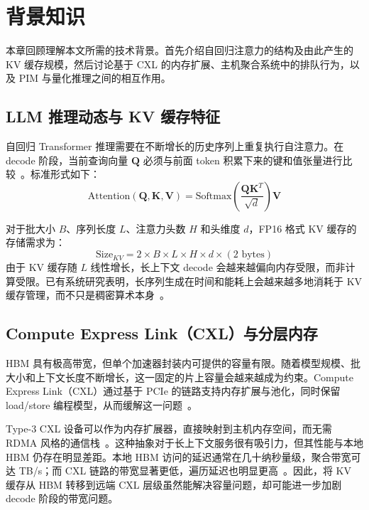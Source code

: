 \chapter{背景知识}
\label{ch:background}

本章回顾理解本文所需的技术背景。首先介绍自回归注意力的结构及由此产生的 KV 缓存规模，然后讨论基于 CXL 的内存扩展、主机聚合系统中的排队行为，以及 PIM 与量化推理之间的相互作用。

\section{LLM 推理动态与 KV 缓存特征}

自回归 Transformer 推理需要在不断增长的历史序列上重复执行自注意力。在 decode 阶段，当前查询向量 $\mathbf{Q}$ 必须与前面 token 积累下来的键和值张量进行比较~\cite{flashattn}。标准形式如下：
\begin{equation}
\label{eq:attn}
\text{Attention}(\mathbf{Q}, \mathbf{K}, \mathbf{V}) = \text{Softmax}\left( \frac{\mathbf{Q} \mathbf{K}^T}{\sqrt{d}} \right) \mathbf{V}
\end{equation}

对于批大小 $B$、序列长度 $L$、注意力头数 $H$ 和头维度 $d$，FP16 格式 KV 缓存的存储需求为：
\begin{equation}
    \text{Size}_{KV} = 2 \times B \times L \times H \times d \times (\text{2 bytes})
\end{equation}
由于 KV 缓存随 $L$ 线性增长，长上下文 decode 会越来越偏向内存受限，而非计算受限。已有系统研究表明，长序列生成在时间和能耗上会越来越多地消耗于 KV 缓存管理，而不只是稠密算术本身~\cite{infinigen}。

\section{Compute Express Link（CXL）与分层内存}

HBM 具有极高带宽，但单个加速器封装内可提供的容量有限。随着模型规模、批大小和上下文长度不断增长，这一固定的片上容量会越来越成为约束。Compute Express Link（CXL）通过基于 PCIe 的链路支持内存扩展与池化，同时保留 load/store 编程模型，从而缓解这一问题~\cite{cxl_standard}。

Type-3 CXL 设备可以作为内存扩展器，直接映射到主机内存空间，而无需 RDMA 风格的通信栈~\cite{direct_cxl}。这种抽象对于长上下文服务很有吸引力，但其性能与本地 HBM 仍存在明显差距。本地 HBM 访问的延迟通常在几十纳秒量级，聚合带宽可达 TB/s；而 CXL 链路的带宽显著更低，遍历延迟也明显更高~\cite{tpp}。因此，将 KV 缓存从 HBM 转移到远端 CXL 层级虽然能解决容量问题，却可能进一步加剧 decode 阶段的带宽问题。

